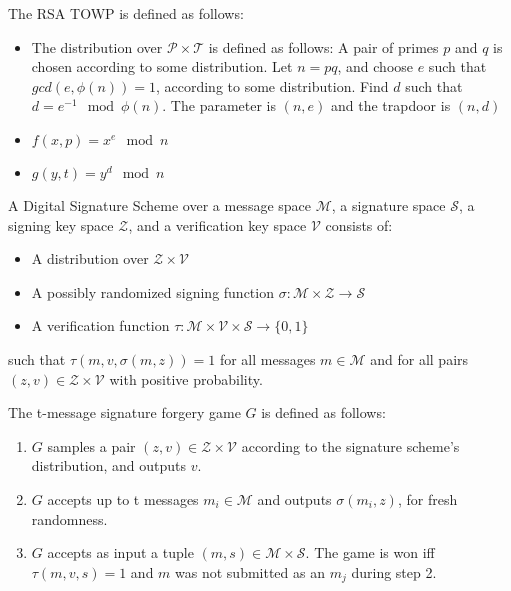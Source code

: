 \documentclass[a4paper,german]{article}
\newenvironment{customdef}[1]{\renewcommand\theinnercustomdef{#1}\innercustomdef}{\endinnercustomdef}
\begin{document}
\begin{customdef}{3.16}
	The RSA TOWP is defined as follows:

	\begin{itemize}

		\item  The distribution over $\mathcal{P \times T}$ is defined as follows:
			A pair of primes $p$ and $q$ is chosen according to some distribution. Let $n = pq$, and choose $e$ such that $gcd(e, \phi(n))=1$, according to some distribution. Find $d$ such that $d = e^{-1} \mod \phi(n)$. The parameter is  $(n, e)$ and the trapdoor is $(n, d)$
		\item  $f(x, p) = x^e \mod n$
		\item  $g(y, t) = y^d \mod n$

	\end{itemize}
\end{customdef}

\begin{customdef}{3.17}
	A Digital Signature Scheme over a message space $\mathcal{M}$, a signature space $\mathcal{S}$, a signing key space $\mathcal{Z}$, and a verification key space $\mathcal{V}$ consists of:

	\begin{itemize}

		\item  A distribution over $\mathcal{Z \times V}$
		\item  A possibly randomized signing function $\sigma : \mathcal{M \times Z} \rightarrow \mathcal{S}$
		\item  A verification function $\tau : \mathcal{M \times V \times S} \rightarrow \{0, 1\}$
	\end{itemize}

	such that $\tau(m, v, \sigma(m, z)) = 1$ for all messages $m \in \mathcal{M}$ and for all pairs $(z, v) \in \mathcal{Z \times V}$ with positive probability.
\end{customdef}

\begin{customdef}{3.18}
	The t-message signature forgery game $G$ is defined as follows:

	\begin{enumerate}

		\item  $G$ samples a pair $(z, v) \in \mathcal{Z \times V}$ according to the signature scheme's distribution, and outputs $v$.

		\item  $G$ accepts up to t messages $m_i \in \mathcal{M}$ and outputs $\sigma(m_i, z)$, for fresh randomness.
		\item  $G$ accepts as input a tuple $(m, s) \in \mathcal{M \times S}$. The game is won iff $\tau(m, v, s) = 1$ and $m$ was not submitted as an $m_j$ during step 2.

	\end{enumerate}
\end{customdef}
\end{document}
